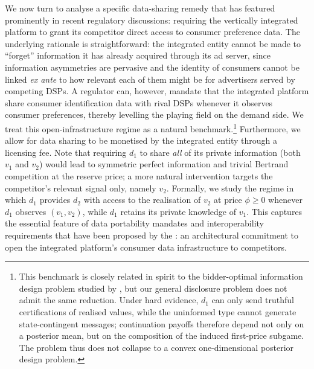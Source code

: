 \noindent We now turn to analyse a specific data-sharing remedy that has featured prominently in recent regulatory discussions: requiring the vertically integrated platform to grant its competitor direct access to consumer preference data. The underlying rationale is straightforward: the integrated entity cannot be made to ``forget'' information it has already acquired through its ad server, since information asymmetries are pervasive and the identity of consumers cannot be linked \textit{ex ante} to how relevant each of them might be for advertisers served by competing DSPs. A regulator can, however, mandate that the integrated platform share consumer identification data with rival DSPs whenever it observes consumer preferences, thereby levelling the playing field on the demand side. We treat this open-infrastructure regime as a natural benchmark.\footnote{This benchmark is closely related in spirit to the bidder-optimal information design problem studied by \textcite{bergemannBidderOptimalInformationStructures2024}, but our general disclosure problem does not admit the same reduction. Under hard evidence, $d_1$ can only send truthful certifications of realised values, while the uninformed type cannot generate state-contingent messages; continuation payoffs therefore depend not only on a posterior mean, but on the composition of the induced first-price subgame. The problem thus does not collapse to a convex one-dimensional posterior design problem.} Furthermore, we allow for data sharing to be monetised by the integrated entity through a licensing fee. Note that requiring $d_1$ to share \textit{all} of its private information (both $v_1$ and $v_2$) would lead to symmetric perfect information and trivial Bertrand competition at the reserve price; a more natural intervention targets the competitor's relevant signal only, namely $v_2$. Formally, we study the regime in which $d_1$ provides $d_2$ with access to the realisation of $v_2$ at price $\phi \geq 0$ whenever $d_1$ observes $(v_1, v_2)$, while $d_1$ retains its private knowledge of $v_1$. This captures the essential feature of data portability mandates and interoperability requirements that have been proposed by the \textcite{competitionandmarketsauthorityOnlinePlatformsDigital2020}: an architectural commitment to open the integrated platform's consumer data infrastructure to competitors.\par

